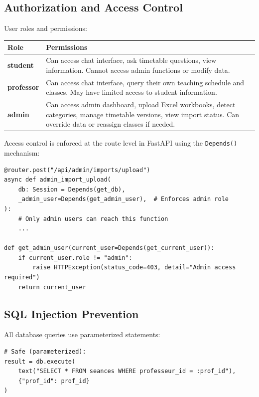 \begin{fig}[H]
\subsection{Authorization and Access Control}

User roles and permissions:

\begin{center}
\begin{tabular}{|p{2.5cm}|p{11cm}|}
\hline
\textbf{Role} & \textbf{Permissions} \\
\hline
\textbf{student} & 
Can access chat interface, ask timetable questions, view information. Cannot access admin functions or modify data. \\
\hline
\textbf{professor} & 
Can access chat interface, query their own teaching schedule and classes. May have limited access to student information. \\
\hline
\textbf{admin} & 
Can access admin dashboard, upload Excel workbooks, detect categories, manage timetable versions, view import status. Can override data or reassign classes if needed. \\
\hline
\end{tabular}
\end{center}

Access control is enforced at the route level in FastAPI using the \texttt{Depends()} mechanism:

\begin{verbatim}
@router.post("/api/admin/imports/upload")
async def admin_import_upload(
    db: Session = Depends(get_db),
    _admin_user=Depends(get_admin_user),  # Enforces admin role
):
    # Only admin users can reach this function
    ...

def get_admin_user(current_user=Depends(get_current_user)):
    if current_user.role != "admin":
        raise HTTPException(status_code=403, detail="Admin access required")
    return current_user
\end{verbatim}

\subsection{SQL Injection Prevention}

All database queries use parameterized statements:

\begin{verbatim}
# Safe (parameterized):
result = db.execute(
    text("SELECT * FROM seances WHERE professeur_id = :prof_id"),
    {"prof_id": prof_id}
)


\end{verbatim}
\end{fig}
